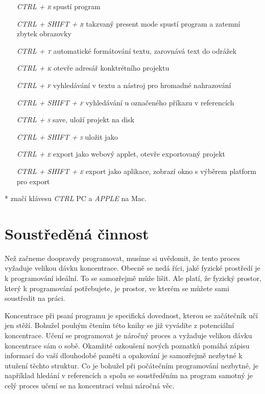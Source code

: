 \documentclass[10pt]{book}
\newcommand{\oddil}[1]{\section{#1}\index{#1}\label{#1}}
\newcommand{\klavesy}[1]{\textsc{\em #1}}
\begin{document}
\begin{itemize}
\item[\klavesy{CTRL + r}]  spustí program
\item[\klavesy{CTRL + SHIFT + r}] takzvaný present mode spustí program a zatemní zbytek obrazovky
\item[\klavesy{CTRL + t}] automatické formátování textu, zarovnává text do odrážek
\item[\klavesy{CTRL + k}] otevře adresář konktrétního projektu
\item[\klavesy{CTRL + f}] vyhledávání v textu a nástroj pro hromadné nahrazování
\item[\klavesy{CTRL + SHIFT + f}] vyhledávání u označeného příkazu v referencích
\item[\klavesy{CTRL + s}] save, uloží projekt na disk
\item[\klavesy{CTRL + SHIFT + s}] uložit jako

\item[\klavesy{CTRL + e}] export jako webový applet, otevře exportovaný projekt
\item[\klavesy{CTRL + SHIFT + e}] export jako aplikace, zobrazí okno s výběrem platform pro export

\end{itemize}

* značí klávesu \klavesy{CTRL} PC a \klavesy{APPLE} na Mac.



\oddil{Soustředěná činnost}

Než začneme doopravdy programovat, musíme si uvědomit, že tento proces vyžaduje velikou dávku koncentrace. Obecně se nedá říci, jaké fyzické prostředí je k programování ideální. To se samozřejmě může lišit. Ale platí, že fyzický prostor, který k programování potřebujete, je prostor, ve kterém se můžete sami soustředit na práci.

Koncentrace při psaní programu je specifická dovednost, kterou se začátečník učí jen stěží. Bohužel pouhým čtením této knihy se již vyvádíte z potenciální koncentrace. Učení se programovat je náročný proces a vyžaduje velikou dávku koncentrace sám o sobě. Okamžité ozkoušení nových poznatků pomáhá zápisu informací do vaší dlouhodobé paměti a opakování je samozřejmě nezbytné k utužení těchto struktur. Co je bohužel při počátečním programování nezbytné, je například hledání v referencích a spolu se soustředěním na program samotný je celý proces učení se na koncentraci velmi náročná věc.
\end{document}
